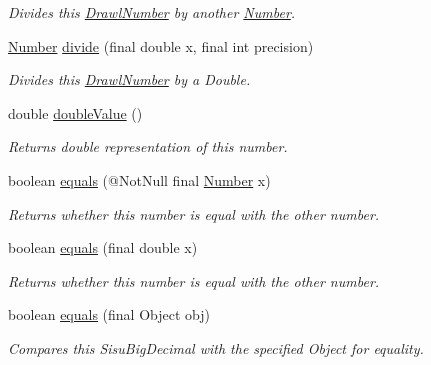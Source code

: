 \begin{DoxyCompactItemize}
\begin{DoxyCompactList}\small\item\em Divides this \hyperlink{classcom_1_1aarrelaakso_1_1drawl_1_1_drawl_number}{Drawl\+Number} by another \hyperlink{interfacecom_1_1aarrelaakso_1_1drawl_1_1_number}{Number}. \end{DoxyCompactList}\item 
\hyperlink{interfacecom_1_1aarrelaakso_1_1drawl_1_1_number}{Number} \hyperlink{classcom_1_1aarrelaakso_1_1drawl_1_1_drawl_number_a4ba0f1728e95fe494d440c04228041f7}{divide} (final double x, final int precision)
\begin{DoxyCompactList}\small\item\em Divides this \hyperlink{classcom_1_1aarrelaakso_1_1drawl_1_1_drawl_number}{Drawl\+Number} by a Double. \end{DoxyCompactList}\item 
double \hyperlink{classcom_1_1aarrelaakso_1_1drawl_1_1_drawl_number_af5e6d77e51e7b6167d18acec2eb26877}{double\+Value} ()
\begin{DoxyCompactList}\small\item\em Returns double representation of this number. \end{DoxyCompactList}\item 
boolean \hyperlink{classcom_1_1aarrelaakso_1_1drawl_1_1_drawl_number_ad5b1c1aea2f1d2d04a9064a3041059c5}{equals} (@Not\+Null final \hyperlink{interfacecom_1_1aarrelaakso_1_1drawl_1_1_number}{Number} x)
\begin{DoxyCompactList}\small\item\em Returns whether this number is equal with the other number. \end{DoxyCompactList}\item 
boolean \hyperlink{classcom_1_1aarrelaakso_1_1drawl_1_1_drawl_number_a09dfa96894d84cc9734e41bf4a88ae3b}{equals} (final double x)
\begin{DoxyCompactList}\small\item\em Returns whether this number is equal with the other number. \end{DoxyCompactList}\item 
boolean \hyperlink{classcom_1_1aarrelaakso_1_1drawl_1_1_drawl_number_a54d65831347b02b14569ddfc021a4ade}{equals} (final Object obj)
\begin{DoxyCompactList}\small\item\em Compares this Sisu\+Big\+Decimal with the specified Object for equality. \end{DoxyCompactList}\item 

\end{DoxyCompactItemize}
